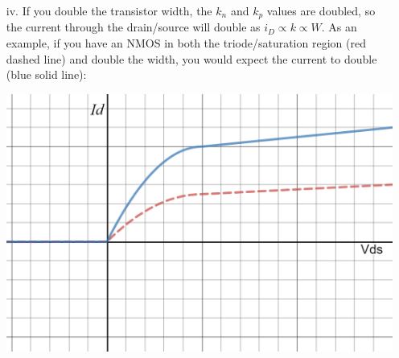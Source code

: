 \documentclass{homework}
\begin{document}
\begin{enumerate}
		\item[iv.] If you double the transistor width, the $k_n$ and $k_p$ values are doubled, so the current through the drain/source will double as $i_D \propto k \propto W$. As an example, if you have an NMOS in both the triode/saturation region (red dashed line) and double the width, you would expect the current to double (blue solid line):
		\begin{center}
			\includegraphics[width=0.8\linewidth]{plot}
		\end{center}
		
	\end{enumerate}
\end{document}
